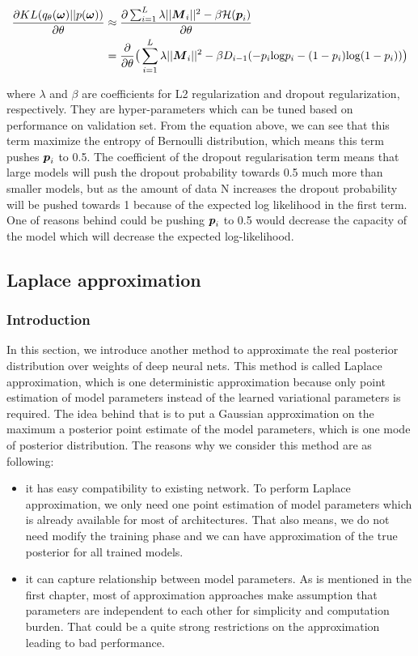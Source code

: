 \begin{equation} 
\begin{aligned}\label{KL_grad_concrete}
\frac{\partial KL(q_{\theta}(\boldsymbol \omega)||p(\boldsymbol \omega))}{\partial \theta} 
&\approx \frac{\partial \sum_{i=1}^{L}\lambda||\boldsymbol M_{i}||^{2}- \beta\mathcal H(\boldsymbol p_{i})}{\partial \theta}  \\
&= \frac{\partial}{\partial \theta} \big( \sum_{i=1}^{L}\lambda||\boldsymbol M_{i}||^{2}- \beta D_{i-1}(-p_{i}\text{log}p_{i} - (1-p_{i})\text{log}(1-p_{i}))\big)
\end{aligned}
\end{equation}

where $\lambda$ and $\beta$ are coefficients for L2 regularization and dropout regularization, respectively. They are hyper-parameters which can be tuned based on performance on validation set.
From the equation above, we can see that this term maximize the entropy of Bernoulli distribution, which means this term pushes $\boldsymbol p_i$ to 0.5. The coefficient of the dropout regularisation term means that large models will push the dropout probability towards 0.5 much more than smaller models, but as the amount of data N increases the dropout probability will be pushed towards 1 because of the expected log likelihood in the first term. One of reasons behind could be pushing $\boldsymbol p_i$ to 0.5 would decrease the capacity of the model which will decrease the expected log-likelihood. 


\subsection{Laplace approximation}
\subsubsection{Introduction}
In this section, we introduce another method to approximate the real posterior distribution over weights of deep neural nets. This method is called Laplace approximation\cite{bishop2006pattern}, which is one deterministic approximation because only point estimation of model parameters instead of the learned variational parameters is required. The idea behind that is to put a Gaussian approximation on the maximum a posterior point estimate of the model parameters, which is one mode of posterior distribution. The reasons why we consider this method are as following:
\begin{itemize}
	\item it has easy compatibility to existing network. To perform Laplace approximation, we only need one point estimation of model parameters which is already available for most of architectures. That also means, we do not need modify the training phase and we can have approximation of the true posterior for all trained models.
	\item it can capture relationship between model parameters. As is mentioned in the first chapter, most of approximation approaches make assumption that parameters are independent to each other for simplicity and computation burden. That could be a quite strong restrictions on the approximation leading to bad performance.
\end{itemize}


